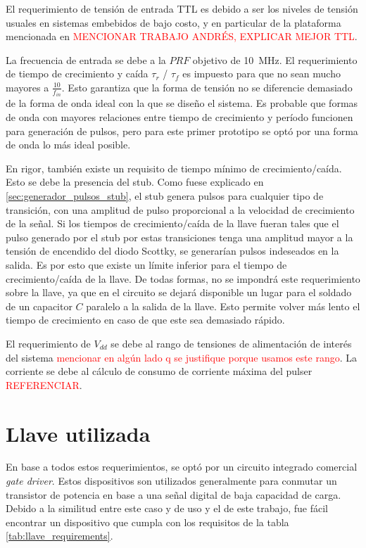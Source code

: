 El requerimiento de tensión de entrada TTL es debido a ser los niveles de
tensión usuales en sistemas embebidos de bajo costo, y en particular de la
plataforma mencionada en \textcolor{red}{MENCIONAR TRABAJO ANDRÉS, EXPLICAR
MEJOR TTL}.

La frecuencia de  entrada se debe a la $PRF$ objetivo de \qty{10}{\mega\hertz}.
El requerimiento de tiempo de crecimiento y caída $\tau_{r}$ / $\tau_{f}$ es
impuesto para que no sean mucho mayores a $\frac{10}{f_{in}}$. Esto garantiza
que la forma de tensión no se diferencie demasiado de la forma de onda ideal con
la que se diseño el sistema. Es probable que formas de onda con mayores
relaciones entre tiempo de crecimiento y período funcionen para generación de
pulsos, pero para este primer prototipo se optó por una forma de onda lo más
ideal posible.

En rigor, también existe un requisito de tiempo mínimo de crecimiento/caída.
Esto se debe la presencia del stub. Como fuese explicado en
\ref{sec:generador_pulsos_stub}, el stub genera pulsos para cualquier tipo de
transición, con una amplitud de pulso proporcional a la velocidad de crecimiento
de la señal. Si los tiempos de crecimiento/caída de la llave fueran tales que el
pulso generado por el stub por estas transiciones tenga una amplitud mayor a la
tensión de encendido del diodo Scottky, se generarían pulsos indeseados en la
salida. Es por esto que existe un límite inferior para el tiempo de
crecimiento/caída de la llave. De todas formas, no se impondrá  este
requerimiento sobre la llave, ya que en el circuito se dejará disponible un
lugar para el soldado de un capacitor $C$ paralelo a la salida de la llave. Esto
permite volver más lento el tiempo de crecimiento en caso de que este sea
demasiado rápido.

El requerimiento de $V_{dd}$ se debe al rango de tensiones de alimentación de
interés del sistema \textcolor{red}{mencionar en algún lado q se justifique
porque usamos este rango}. La corriente se debe al cálculo de consumo de
corriente máxima del pulser \textcolor{red}{REFERENCIAR}.

\section{Llave utilizada}

En base a todos estos requerimientos, se optó por un circuito integrado
comercial \textit{gate driver}. Estos dispositivos son utilizados generalmente
para conmutar un transistor de potencia en base a  una señal digital de baja
capacidad de carga. Debido a la similitud entre este caso y de uso y el de este
trabajo, fue fácil encontrar un dispositivo que cumpla con los requisitos de la
tabla \ref{tab:llave_requirements}.

